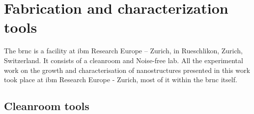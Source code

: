 \chapter{Fabrication and characterization tools}
\label{chap:tools}

The \acf{brnc} is a facility at \acs{ibm} Research Europe – Zurich, in Rueschlikon, Zurich, Switzerland. It consists of a cleanroom and Noise-free lab. All the experimental work on the growth and characterisation of nanostructures presented in this work took place at \acs{ibm} Research Europe - Zurich, most of it within the \acs{brnc} itself. 

\section{Cleanroom tools}

